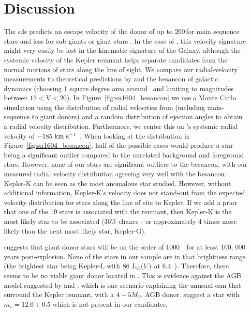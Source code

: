 \documentclass[preprint2]{aastex}
\begin{document}
\section{Discussion}
\label{sec:discussion}

The \gls{sds} predicts an escape velocity of the donor of up to 200\,\kms for main sequence stars and less for sub giants or giant stars \citep[down to roughly 60~\,\kms;][]{2008ApJ...677L.109H}. In the case of , this velocity signature might very easily be lost in the kinematic signature of the Galaxy, although the systemic velocity of the Kepler remnant helps separate candidates from the normal motions of stars along the line of sight. We compare our radial-velocity measurements to theoretical predictions by \citet{2008ApJ...677L.109H} and the \gls{besancon} of galactic dynamics (choosing 1 square degree area around \ and limiting to magnitudes between $15<$V$<20$). In Figure~\ref{fig:sn1604_besancon} we use a Monte Carlo simulation using the distribution of radial velocities from \citet{2008ApJ...677L.109H} (including main-sequence to giant donors) and a random distribution of ejection angles to obtain a radial velocity distribution. Furthermore, we center this on 's systemic radial velocity of $-185~\textrm{km}~\textrm{s}^{-1}$\ \citep{2003A&A...407..249S}. When looking at the \citet{2008ApJ...677L.109H} distribution in Figure~\ref{fig:sn1604_besancon}, half of the possible cases would produce a star being a significant outlier compared to the unrelated background and foreground stars. However, none of our stars are significant outliers to the \gls{besancon}, with our measured radial velocity distribution agreeing very well with the \gls{besancon}. Kepler-K can be seen as the most anomalous star studied. However, without additional information, Kepler-K's velocity does not stand-out from the expected velocity distribution for stars along the line of site to Kepler. If we add a prior that one of the 19 stars is associated with the remnant, then Kepler-K is the most likely star to be associated (36\% chance - or approximately 4 times more likely than the next most likely star, Kepler-G).

\citet{2000ApJS..128..615M} suggests that giant donor stars will be on the order of 1000~\lsun\  for at least 100, 000 years post-explosion. None of the stars in our sample are in that brightness range (the brightest star being Kepler-L with $86~\hbox{$L_{\odot}$}(V)$ at 6.4~\kpc). Therefore, there seems to be no viable giant donor located in . This is evidence against the AGB model suggested by \citet{2012A&A...537A.139C} and \citet{2013ApJ...764...63B}, which is one scenario explaining the unusual \gls{csm} that surround the Kepler remnant, with a $4 - 5 \hbox{$M_{\odot}$}$ AGB donor. \citet{2012A&A...537A.139C} suggest a star with $m_v=12.0 \pm 0.5$ which is not present in our candidates. 
\end{document}
